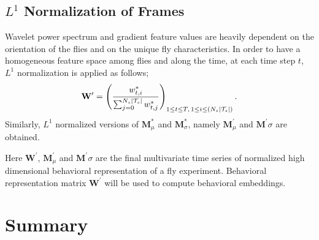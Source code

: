 \subsection{\texorpdfstring{$L^1$}{L1} Normalization of Frames}
Wavelet power spectrum and gradient feature values are heavily dependent on the orientation of the flies and on the unique fly characteristics.
In order to have a homogeneous feature space among flies and along the time, at each time step $t$, $L^1$ normalization is applied as follows;
\begin{equation}
	\mathbf{W}^{\prime}  = \left(\frac{w^\ast_{t,i}}{\sum_{j=0}^{N_s \lvert\mathcal{T}_s\rvert}w^\ast_{t, j}}\right)_{1 \leq t \leq T, \, 1 \leq i \leq \left(N_s \lvert\mathcal{T}_s\rvert\right)}.
\end{equation}
Similarly, $L^1$ normalized versions of $\mathbf{M}^\ast_\mu$ and $\mathbf{M}^\ast_\sigma$, namely $\mathbf{M}^\prime_\mu$ and $\mathbf{M}^\prime\sigma$ are obtained.

Here $\mathbf{W}^\prime$, $\mathbf{M}^\prime_\mu$ and $\mathbf{M}^\prime\sigma$ are the final multivariate time series of normalized high dimensional behavioral representation of a fly experiment. Behavioral representation matrix $\mathbf{W}^\prime$ will be used to compute behavioral embeddings.

\section{Summary}
